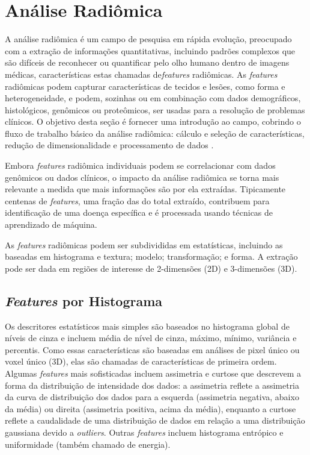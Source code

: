 \section{Análise Radiômica}

A análise radiômica é um campo de pesquisa em rápida evolução, preocupado com a extração de informações quantitativas, incluindo padrões complexos que são difíceis de reconhecer ou quantificar pelo olho humano dentro de imagens médicas, características estas chamadas  de\textit{features} radiômicas. As \textit{features} radiômicas podem capturar características de tecidos e lesões, como forma e heterogeneidade, e podem, sozinhas ou em combinação com dados demográficos, histológicos, genômicos ou proteômicos, ser usadas para a resolução de problemas clínicos. O objetivo desta seção é fornecer uma introdução ao campo, cobrindo o fluxo de trabalho básico da análise radiômica: cálculo e seleção de características, redução de dimensionalidade e processamento de dados \cite{mayerhoeferIntroductionRadiomics2020}.

Embora \textit{features} radiômica individuais podem se correlacionar com dados genômicos ou dados clínicos, o impacto da análise radiômica se torna mais relevante a medida que mais informações são por ela extraídas. Tipicamente centenas de \textit{features}, uma fração das do total extraído, contribuem para identificação de uma doença específica e é processada usando técnicas de aprendizado de máquina.

As \textit{features} radiômicas podem ser subdivididas em estatísticas, incluindo as baseadas em histograma e textura; modelo; transformação; e forma. A extração pode ser dada em regiões de interesse de 2-dimensões (2D) e 3-dimensões (3D).

\subsection{\textit{Features} por Histograma}

Os descritores estatísticos mais simples são baseados no histograma global de níveis de cinza e incluem média de nível de cinza, máximo, mínimo, variância e percentis. Como essas características são baseadas em análises de pixel único ou voxel único (3D), elas são chamadas de características de primeira ordem. Algumas \textit{features} mais sofisticadas incluem assimetria e curtose que descrevem a forma da distribuição de intensidade dos dados: a assimetria reflete a assimetria da curva de distribuição dos dados para a esquerda (assimetria negativa, abaixo da média) ou direita (assimetria positiva, acima da média), enquanto a curtose reflete a caudalidade de uma distribuição de dados em relação a uma distribuição gaussiana devido a \textit{outliers}. Outras \textit{features} incluem histograma entrópico e uniformidade (também chamado de energia).

